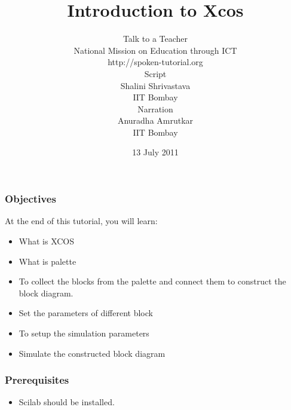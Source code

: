 \documentclass[brown]{beamer}[17pt]
\begin{document}
\bfseries
\title
[ Introduction to Xcos
\hspace{0.5cm}
\insertframenumber/\inserttotalframenumber]
{\LARGE Introduction to Xcos}
\author[Script-Shalini Shrivastava\\  Narration-Anuradha Amrutkar]{{\Large Talk to a Teacher \\ National Mission on Education through ICT \\ http://spoken-tutorial.org }\\ [0.5cm]	{\scriptsize Script}\\Shalini Shrivastava \\{\scriptsize IIT Bombay } \\{\scriptsize Narration} \\  Anuradha Amrutkar \\{\scriptsize IIT Bombay}\vspace{-.5 cm}}
 \date{13 July 2011}

\begin{frame}
   \titlepage
\end{frame}

\begin{frame}[fragile]
\frametitle{Objectives }
At the end of this tutorial, you will learn:
\begin{itemize}
\item What is XCOS
\item What is palette
\item To collect the blocks from the palette and connect them to construct the block diagram.
\item Set the parameters of different block 
\item To setup the simulation parameters
\item Simulate the constructed block diagram
\end{itemize}
\end{frame}

\begin{frame}[fragile]
\frametitle{Prerequisites}
\begin{itemize}
\item Scilab should be installed.
\end{itemize}
\end{frame}
\end{document}
